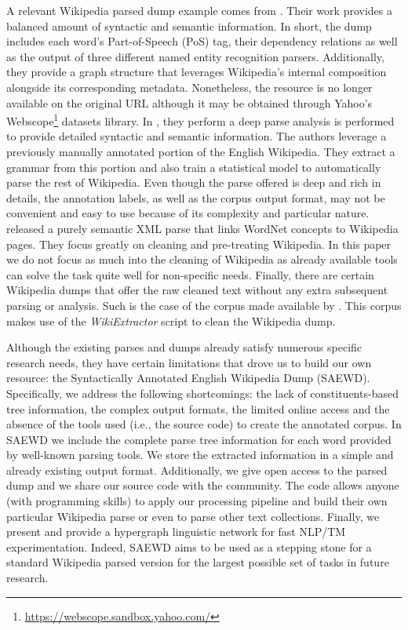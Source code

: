 A relevant Wikipedia parsed dump example comes from \cite{ATSERIAS08}. Their work provides a balanced amount of syntactic and semantic information. In short, the dump includes each word's Part-of-Speech (PoS) tag, their dependency relations as well as the output of three different named entity recognition parsers. Additionally, they provide a graph structure that leverages Wikipedia's internal composition alongside its corresponding metadata. Nonetheless, the resource is no longer available on the original URL although it may be obtained through Yahoo's Webscope\footnote{\url{https://webscope.sandbox.yahoo.com/}} datasets library.  In \cite{FLICKINGER10}, they perform a deep parse analysis is performed to provide detailed syntactic and semantic information. The authors leverage a previously manually annotated portion of the English Wikipedia. They extract a grammar from this portion and also train a statistical model  to automatically parse the rest of Wikipedia. Even though the parse offered is deep and rich in details, the annotation labels, as well as the corpus output format, may not be convenient and easy to use because of its complexity and particular nature. \cite{SchenkelSK07}  released a purely semantic XML parse that links WordNet concepts to Wikipedia pages. They focus greatly on cleaning and pre-treating Wikipedia. In this paper we do not focus as much into the cleaning of Wikipedia as already available tools can solve the task quite well for non-specific needs. 
Finally, there are certain Wikipedia dumps that offer the raw cleaned text without any extra subsequent parsing or analysis. Such is the case of the corpus made available by \cite{westbury2010}. This corpus makes  use of the \textit{WikiExtractor} script  \cite{Attardi2015} to clean the Wikipedia dump.
  
  
Although the existing parses and dumps already satisfy numerous specific research needs, they have certain limitations that drove us to build our own resource: the Syntactically Annotated English Wikipedia  Dump (SAEWD). Specifically, we address the following shortcomings: the lack of constituents-based tree information, the complex output formats, the limited online access and the absence of the tools used (i.e., the source code) to create the annotated corpus. In SAEWD we include the complete parse tree information for each word provided by well-known parsing tools. We store the extracted information in a simple and already existing output format. Additionally, we give open access to the parsed dump and we share our source code with the community. The code allows anyone (with programming skills) to  apply our processing pipeline and build their own particular Wikipedia parse or even to parse other text collections. Finally, we present and provide a hypergraph linguistic network for fast NLP/TM experimentation. Indeed, SAEWD aims to be used as a stepping stone for a standard Wikipedia parsed version for the largest possible set of tasks in future research. 

